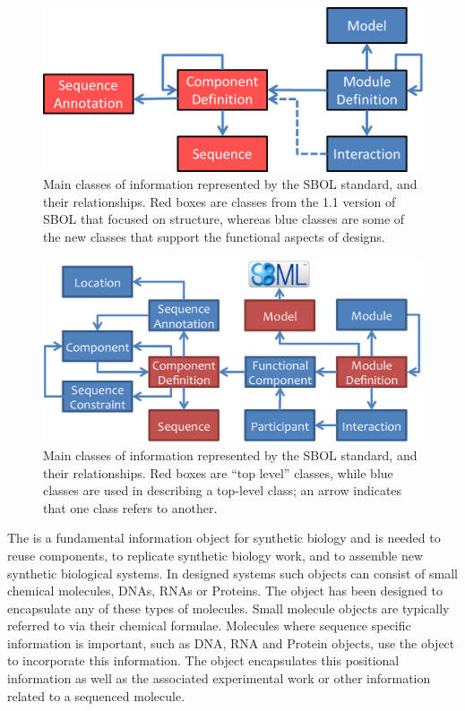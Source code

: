 \begin{figure}[ht]
\begin{center}
\includegraphics[scale=0.5]{images/OverviewFigforSpec-v3.png}
\caption{Main classes of information represented by the SBOL standard, and their relationships.  Red boxes are classes from the 1.1 version of SBOL that focused on structure, whereas blue classes are some of the new classes that support the functional aspects of designs.}
\label{images:overview1}
\end{center}
\end{figure}

\begin{figure}[ht]
\begin{center}
\includegraphics[scale=1.2]{images/SBOL2_2_revised.png}
\caption{Main classes of information represented by the SBOL standard, and their relationships.  Red boxes are ``top level'' classes, while blue classes are used in describing a top-level class; an arrow indicates that one class refers to another.}
\label{images:overview2}
\end{center}
\end{figure}

The  is a fundamental information object for synthetic biology and is needed to reuse components, to replicate synthetic biology work, and to assemble new synthetic biological systems. In designed systems such objects can consist of small chemical molecules, DNAs, RNAs or Proteins. The  object has been designed to encapsulate any of these types of molecules. Small molecule  objects are typically referred to via their chemical formulae. Molecules where sequence specific information is important, such as DNA, RNA and Protein  objects, use the object to incorporate this information. The  object encapsulates this positional information as well as the associated experimental work or other information related to a sequenced molecule.

